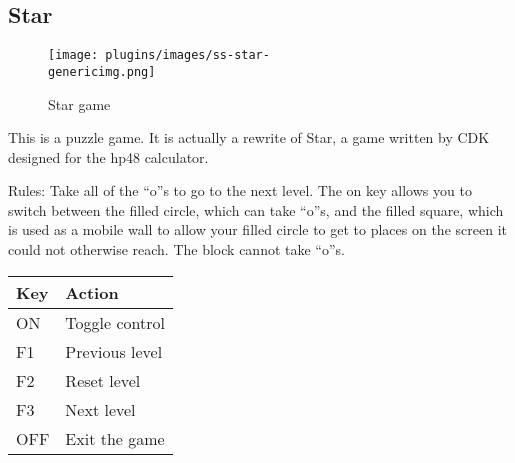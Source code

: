 \subsection{Star}
\begin{figure}[h!]
\begin{center}
\texttt{[image: plugins/images/ss-star-\\genericimg.png]}
\end{center}
\caption{Star game}
\end{figure}

This is a puzzle game.  It is actually a rewrite of Star, a game written
by CDK designed for the hp48 calculator.

Rules: Take all of the ``o''s to go to the
next level.  The on key allows you to switch between the filled circle,
which can take ``o''s, and the filled square, which is used as a mobile
wall to allow your filled circle to get to places on the screen it
could not otherwise reach. The block cannot take ``o''s.

\begin{table}[h!]
\begin{center}
\begin{tabular}{@{}ll@{}}\toprule
\textbf{Key} & \textbf{Action} \\\midrule
ON & Toggle control \\
F1 & Previous level \\
F2 & Reset level \\
F3 & Next level \\
OFF & Exit the game \\\bottomrule
\end{tabular}
\end{center}
\end{table}
